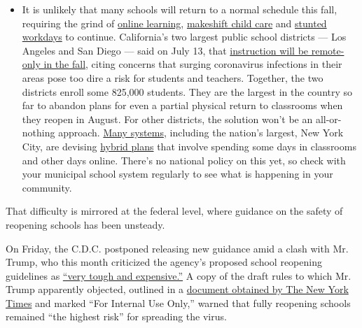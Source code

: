 \begin{itemize}
  \begin{itemize}
  \tightlist
  \item
    It is unlikely that many schools will return to a normal schedule
    this fall, requiring the grind of
    \href{https://www.nytimes3xbfgragh.onion/2020/06/05/us/coronavirus-education-lost-learning.html?action=click\&pgtype=Article\&state=default\&region=MAIN_CONTENT_3\&context=storylines_faq}{online
    learning},
    \href{https://www.nytimes3xbfgragh.onion/2020/05/29/us/coronavirus-child-care-centers.html?action=click\&pgtype=Article\&state=default\&region=MAIN_CONTENT_3\&context=storylines_faq}{makeshift
    child care} and
    \href{https://www.nytimes3xbfgragh.onion/2020/06/03/business/economy/coronavirus-working-women.html?action=click\&pgtype=Article\&state=default\&region=MAIN_CONTENT_3\&context=storylines_faq}{stunted
    workdays} to continue. California's two largest public school
    districts --- Los Angeles and San Diego --- said on July 13, that
    \href{https://www.nytimes3xbfgragh.onion/2020/07/13/us/lausd-san-diego-school-reopening.html?action=click\&pgtype=Article\&state=default\&region=MAIN_CONTENT_3\&context=storylines_faq}{instruction
    will be remote-only in the fall}, citing concerns that surging
    coronavirus infections in their areas pose too dire a risk for
    students and teachers. Together, the two districts enroll some
    825,000 students. They are the largest in the country so far to
    abandon plans for even a partial physical return to classrooms when
    they reopen in August. For other districts, the solution won't be an
    all-or-nothing approach.
    \href{https://bioethics.jhu.edu/research-and-outreach/projects/eschool-initiative/school-policy-tracker/}{Many
    systems}, including the nation's largest, New York City, are
    devising
    \href{https://www.nytimes3xbfgragh.onion/2020/06/26/us/coronavirus-schools-reopen-fall.html?action=click\&pgtype=Article\&state=default\&region=MAIN_CONTENT_3\&context=storylines_faq}{hybrid
    plans} that involve spending some days in classrooms and other days
    online. There's no national policy on this yet, so check with your
    municipal school system regularly to see what is happening in your
    community.
  \end{itemize}
\end{itemize}

That difficulty is mirrored at the federal level, where guidance on the
safety of reopening schools has been unsteady.

On Friday, the C.D.C. postponed releasing new guidance amid a clash with
Mr. Trump, who this month criticized the agency's proposed school
reopening guidelines as
\href{https://www.nytimes3xbfgragh.onion/2020/07/08/us/politics/trump-schools-reopening.html}{``very
tough and expensive.''} A copy of the draft rules to which Mr. Trump
apparently objected, outlined in a
\href{https://www.nytimes3xbfgragh.onion/2020/07/10/us/politics/trump-schools-reopening.html}{document
obtained by The New York Times} and marked ``For Internal Use Only,''
warned that fully reopening schools remained ``the highest risk'' for
spreading the virus.

